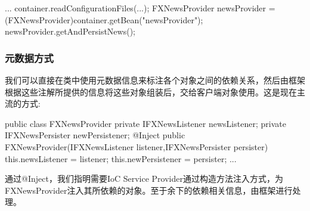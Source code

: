 \begin{Java}
... 
container.readConfigurationFiles(...); 
FXNewsProvider newsProvider = (FXNewsProvider)container.getBean("newsProvider"); 
newsProvider.getAndPersistNews(); 
\end{Java}

\subsubsection{元数据方式}

我们可以直接在类中使用元数据信息来标注各个对象之间的依赖关系，然后由框架根据这些注解所提供的信息将这些对象组装后，交给客户端对象使用。这是现在主流的方式:

\begin{Java}
public class FXNewsProvider { 
    private IFXNewsListener  newsListener;
    private IFXNewsPersister newPersistener;
    @Inject
    public FXNewsProvider(IFXNewsListener listener,IFXNewsPersister persister) {
        this.newsListener   = listener;
        this.newPersistener = persister;
    }    
    ...  
} 
\end{Java}

通过@Inject，我们指明需要IoC Service Provider通过构造方法注入方式，为FXNewsProvider注入其所依赖的对象。至于余下的依赖相关信息，由框架进行处理。